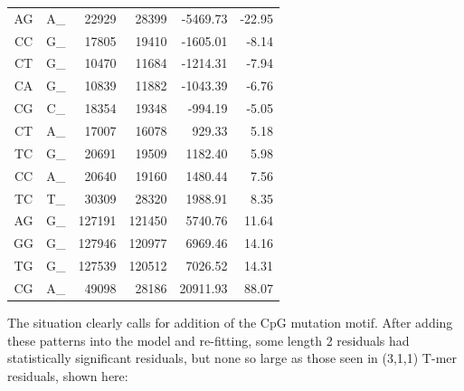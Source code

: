 \documentclass{article}
\newcommand{\nA}{\mbox{A}}  %
\newcommand{\nC}{\mbox{C}}
\newcommand{\nG}{\mbox{G}}
\newcommand{\nT}{\mbox{T}}
\theoremstyle{plain}
\theoremstyle{definition}
\begin{document}
\begin{center}
\begin{tabular}{ccrrrr}
                \nA\nG  &  \nA\_  &   22929  &   28399  &   -5469.73  &  -22.95 \\
                \nC\nC  &  \nG\_  &   17805  &   19410  &   -1605.01  &   -8.14 \\
                \nC\nT  &  \nG\_  &   10470  &   11684  &   -1214.31  &   -7.94 \\
                \nC\nA  &  \nG\_  &   10839  &   11882  &   -1043.39  &   -6.76 \\
                \nC\nG  &  \nC\_  &   18354  &   19348  &    -994.19  &   -5.05 \\
                \hline
                \nC\nT  &  \nA\_  &   17007  &   16078  &     929.33  &    5.18 \\
                \nT\nC  &  \nG\_  &   20691  &   19509  &    1182.40  &    5.98 \\
                \nC\nC  &  \nA\_  &   20640  &   19160  &    1480.44  &    7.56 \\
                \nT\nC  &  \nT\_  &   30309  &   28320  &    1988.91  &    8.35 \\
                \nA\nG  &  \nG\_  &  127191  &  121450  &    5740.76  &   11.64 \\
                \nG\nG  &  \nG\_  &  127946  &  120977  &    6969.46  &   14.16 \\
                \nT\nG  &  \nG\_  &  127539  &  120512  &    7026.52  &   14.31 \\
                \nC\nG  &  \nA\_  &   49098  &   28186  &   20911.93  &   88.07 \\
                \hline
        \end{tabular}
    \end{center}
The situation clearly calls for addition of the CpG mutation motif.
After adding these patterns into the model and re-fitting,
some length 2 residuals had statistically significant residuals,
but none so large as those seen in (3,1,1) T-mer residuals, shown here:
\end{document}

